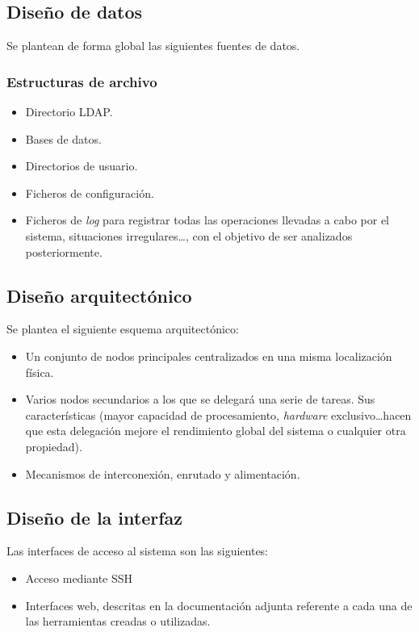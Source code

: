 \subsection{Diseño de datos}

Se plantean de forma global las siguientes fuentes de datos.

\subsubsection{Estructuras de archivo}

\begin{itemize}
  \item Directorio LDAP.
  \item Bases de datos.
  \item Directorios de usuario.
  \item Ficheros de configuración.
  \item Ficheros de \textit{log} para registrar todas las operaciones llevadas a cabo por el sistema, situaciones irregulares\dots, con el objetivo de ser analizados posteriormente.
\end{itemize}

\subsection{Diseño arquitectónico}

Se plantea el siguiente esquema arquitectónico:

\begin{itemize}
\item Un conjunto de nodos principales centralizados en una misma localización física.
\item Varios nodos secundarios a los que se delegará una serie de tareas. Sus características (mayor capacidad de procesamiento, \textit{hardware} exclusivo\dots hacen que esta delegación mejore el rendimiento global del sistema o cualquier otra propiedad).
\item Mecanismos de interconexión, enrutado y alimentación.
\end{itemize}

\subsection{Diseño de la interfaz}

Las interfaces de acceso al sistema son las siguientes:

\begin{itemize}
\item Acceso mediante SSH
\item Interfaces web, descritas en la documentación adjunta referente a cada una de las herramientas creadas o utilizadas.
\end{itemize}
